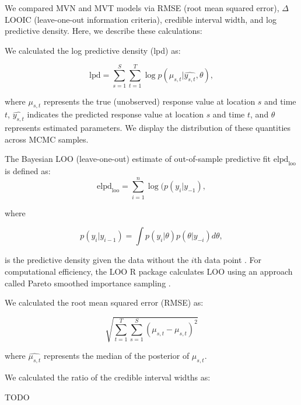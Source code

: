 \documentclass[12pt,english]{article}
\begin{document}
We compared MVN and MVT models via RMSE (root mean squared error), $\Delta$
LOOIC (leave-one-out information criteria), credible interval width,
and log predictive density. Here, we describe these calculations:

We calculated the log predictive density (lpd) as:

\begin{equation}
  \mathrm{lpd} = \sum^{S}_{s=1}{ \sum^{T}_{t=1}{ \log  p(\mu_{s,t} | \widehat{y_{s,t}}, \theta)}},
\end{equation}

\noindent where $\mu_{s,t}$ represents the true (unobserved) response value at
location $s$ and time $t$, $\widehat{y_{s,t}}$ indicates the predicted
response value at location $s$ and time $t$, and $\theta$ represents estimated
parameters. We display the distribution of these quantities across MCMC
samples.

The Bayesian LOO (leave-one-out) estimate of out-of-sample
predictive fit $\mathrm{elpd}_\mathrm{loo}$ is defined as:
\begin{equation}
  \mathrm{elpd}_\mathrm{loo} = \sum^{n}_{i=1}{\log ( p(y_i | y_{-1}) },
\end{equation}

\noindent where

\begin{equation}
  p(y_i | y_{i-1}) = \int p(y_i | \theta) p (\theta | y_{-i}) d \theta ,
\end{equation}

\noindent is the predictive density given the data without the $i$th data
point \citep{vehtari2016}. For computational efficiency, the LOO R package
calculates LOO using an approach called Pareto smoothed importance sampling
\citep{vehtari2016}.

We calculated the root mean squared error (RMSE) as:

\begin{equation}
  \sqrt{ \sum^{T}_{t=1}{ \sum^{S}_{s=1}{ (\mu_{s,t} - \widehat{ \mu_{s,t} })^2 } } }
\end{equation}

\noindent where $\widehat{\mu_{s,t}}$ represents the median of the posterior
of $\mu_{s,t}$.

We calculated the ratio of the credible interval widths as:

TODO

\renewcommand{\thefigure}{S\arabic{figure}}
\renewcommand{\thetable}{S\arabic{table}}
\setcounter{figure}{0}
\setcounter{table}{0}
\end{document}
